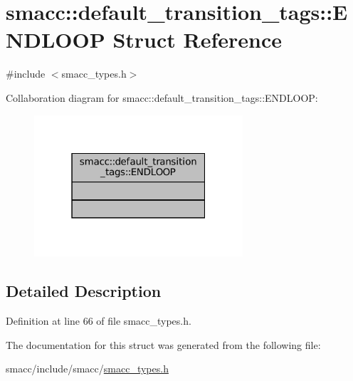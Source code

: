 \hypertarget{structsmacc_1_1default__transition__tags_1_1ENDLOOP}{}\section{smacc\+:\+:default\+\_\+transition\+\_\+tags\+:\+:E\+N\+D\+L\+O\+OP Struct Reference}
\label{structsmacc_1_1default__transition__tags_1_1ENDLOOP}


{\ttfamily \#include $<$smacc\+\_\+types.\+h$>$}



Collaboration diagram for smacc\+:\+:default\+\_\+transition\+\_\+tags\+:\+:E\+N\+D\+L\+O\+OP\+:
\nopagebreak
\begin{figure}[H]
\begin{center}
\leavevmode
\includegraphics[width=220pt]{structsmacc_1_1default__transition__tags_1_1ENDLOOP__coll__graph}
\end{center}
\end{figure}


\subsection{Detailed Description}


Definition at line 66 of file smacc\+\_\+types.\+h.



The documentation for this struct was generated from the following file\+:\begin{DoxyCompactItemize}
\item 
smacc/include/smacc/\hyperlink{smacc__types_8h}{smacc\+\_\+types.\+h}\end{DoxyCompactItemize}
